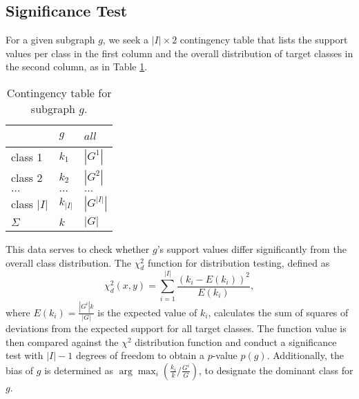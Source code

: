 \documentclass{sig-alternate}
\begin{document}
\subsection{Significance Test}
\label{ss:significance-test}
For a given subgraph $g$, we seek a $|I| \times 2$ contingency table that lists the
support values per class in the first column and the overall distribution of target
classes in the second column, as in Table \ref{t-ContingencyTableIndTest}.
\begin{table}[t]
  \centering
  \begin{tabular}{|l|l|l|}
    \hline
    ~           &	$g$       & $all$       \\\hline
    class 1	    &	$k_1$     & $|G^1|$     \\\hline
    class 2 	  &	$k_2$     & $|G^2|$     \\\hline
    $\ldots$ 	  &	$\ldots$  & $\ldots$    \\\hline
    class $|I|$	&	$k_{|I|}$ & $|G^{|I|}|$ \\\hline
    $\Sigma$	  &	$k$       & $|G|$       \\\hline
  \end{tabular}
  \caption[]{Contingency table for subgraph $g$.}
  \label{t-ContingencyTableIndTest}
\end{table}
This data serves to check whether $g$'s support values differ
significantly from the overall class distribution. The $\chi^2_d$ function for
distribution testing, defined as
\begin{equation}
  \chi^2_d(x,y) = \sum_{i=1}^{|I|} \frac{(k_i-E(k_i))^2}{E(k_i)},
  \label{eq:chid}
\end{equation} 
where $E(k_i)=\frac{|G^{i}| k}{|G|}$ is the expected value of $k_i$, calculates
the sum of squares of deviations from the expected support for all target
classes. The function value is then compared against the $\chi^2$
distribution function and conduct a significance test with
$|I|-1$ degrees of freedom to obtain a $p$-value $p(g)$. 
Additionally, the bias of $g$ is determined as $\arg\max_i (\frac{k_i}{k}/\frac{G^i}{G})$, to designate the dominant class for $g$.
\end{document}
